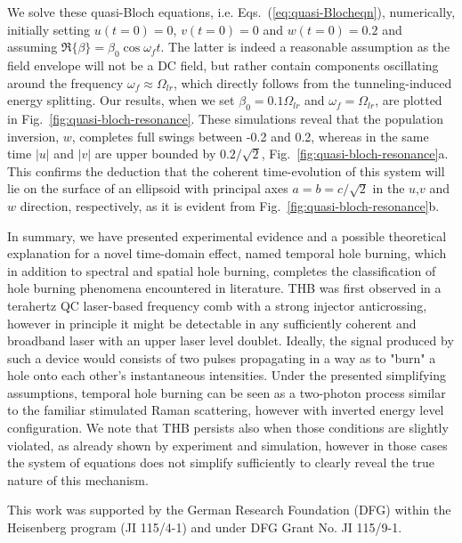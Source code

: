 \documentclass[reprint,secnumarabic,amssymb, nobibnotes, aip, prd]{revtex4-1}
\newcommand{\vspacec}{\vspace{-0.3cm}}
\begin{document}
\vspacec
We solve these quasi-Bloch equations, i.e. Eqs.~(\ref{eq:quasi-Blocheqn}), numerically, initially setting $u(t=0)=0$, $v(t=0) = 0$ and $w(t=0) = 0.2$ and assuming $\Re\{\beta\} = \beta_0 \cos\omega_f t$. The latter is indeed a reasonable assumption as the field envelope will not be a DC field, but rather contain components oscillating around the frequency $\omega_f \approx \Omega_{lr}$, which directly follows from the tunneling-induced energy splitting. Our results, when we set $\beta_0 = 0.1\Omega_{lr}$ and $\omega_f = \Omega_{lr}$, are plotted in Fig.~\ref{fig:quasi-bloch-resonance}. These simulations reveal that the population inversion, $w$, completes full swings between -0.2 and 0.2, whereas in the same time $|u|$ and $|v|$ are upper bounded by $0.2/\sqrt{2}$, Fig.~\ref{fig:quasi-bloch-resonance}a. This confirms the deduction that the coherent time-evolution of this system will lie on the surface of an ellipsoid with principal axes $a=b=c/\sqrt{2}$ in the $u$,$v$ and $w$ direction, respectively, as it is evident from Fig.~\ref{fig:quasi-bloch-resonance}b. %

In summary, we have presented experimental evidence and a possible theoretical explanation for a novel time-domain effect, named temporal hole burning, which in addition to spectral and spatial hole burning, completes the classification of hole burning phenomena encountered in  literature. THB was first observed in a terahertz QC laser-based frequency comb with a strong injector anticrossing\cite{burghoff2015evaluating}, however in principle it might be detectable in any sufficiently coherent and broadband laser with an upper laser level doublet. Ideally, the signal produced by such a device would consists of two pulses propagating in a way as to "burn" a hole onto each other's instantaneous intensities. Under the presented simplifying assumptions, temporal hole burning can be seen as a two-photon process similar to the familiar stimulated Raman scattering, however with inverted energy level configuration. We note that THB persists also when those conditions are slightly violated, as already shown by experiment\cite{burghoff2015evaluating} and simulation\cite{petz2016}, however in those cases the system of equations does not simplify sufficiently to clearly reveal the true nature of this mechanism. 

This work was supported by the German Research Foundation (DFG) within the Heisenberg program (JI 115/4-1) and under DFG Grant No. JI 115/9-1.

\end{document}
